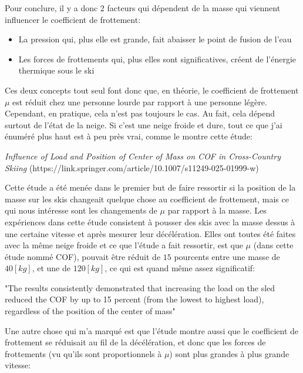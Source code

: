\documentclass{article}
\begin{document}
Pour conclure, il y a donc 2 facteurs qui dépendent de la masse qui viennent influencer le coefficient de frottement:
\begin{itemize}
    \item La pression qui, plus elle est grande, fait abaisser le point de fusion de l'eau
    \item Les forces de frottements qui, plus elles sont significatives, créent de l'énergie thermique sous le ski
\end{itemize}

Ces deux concepts tout seul font donc que, en théorie, le coefficient de frottement $\mu$ est réduit chez une personne lourde par rapport à une personne légère. Cependant, en pratique, cela n'est pas toujours le cas. Au fait, cela dépend surtout de l'état de la neige. Si c'est une neige froide et dure, tout ce que j'ai énuméré plus haut est à peu près vrai, comme le montre cette étude:

\begin{center}
    \textit{Influence of Load and Position of Center of Mass on COF in Cross-Country Skiing} \cite{sandberg2025influence}
    \newline (https://link.springer.com/article/10.1007/s11249-025-01999-w) 
\end{center}



Cette étude a été menée dans le premier but de faire ressortir si la position de la masse sur les skis changeait quelque chose au coefficient de frottement, mais ce qui nous intéresse sont les changements de $\mu$ par rapport à la masse. Les expériences dans cette étude consistent à pousser des skis avec la masse dessus à une certaine vitesse et après mesurer leur décélération. Elles ont toutes été faites avec la même neige froide et ce que l'étude a fait ressortir, est que $\mu$ (dans cette étude nommé COF), pouvait être réduit de $15$ pourcents entre une masse de $40[kg]$, et une de $120[kg]$, ce qui est quand même assez significatif:
\begin{center}
    "The results consistently demonstrated that increasing the load on the sled reduced the COF by up to 15 percent (from the lowest to highest load), regardless of the position of the center of mass"
\end{center}
Une autre chose qui m'a marqué est que l'étude montre aussi que le coefficient de frottement se réduisait au fil de la décélération, et donc que les forces de frottements (vu qu'ils sont proportionnels à $\mu$) sont plus grandes à plus grande vitesse:
\end{document}
